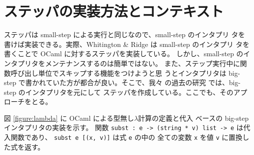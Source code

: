 \section{ステッパの実装方法とコンテキスト}
\label{section:context}


%

ステッパは small-step による実行と同じなので、small-step のインタプリ
タを書けば実装できる。実際、Whitington \& Ridge \cite{EPTCS294.3} は small-step のインタプリ
タを書くことで OCaml に対するステッパを実装している。
しかし、small-step のインタプリタをメンテナンスするのは簡単ではない。
また、ステップ実行中に関数呼び出し単位でスキップする機能をつけようと思
うとインタプリタは big-step で書かれていた方が都合が良い。そこで、我々
の過去の研究 \cite{FCA19} では、big-step のインタプリタを元にして
ステッパを作成している。ここでも、そのアプローチをとる。

図 \ref{figure:lambda} に OCaml による型無し$\lambda$計算の定義と代入
ベースの big-step インタプリタの実装を示す。
関数 \texttt{subst :\ e -> (string * v) list -> e} は代入関数であり、
\texttt{subst e [(x, v)]} は式 \texttt{e} の中の
全ての変数 \texttt{x} を値 \texttt{v} に置換した式を返す。



